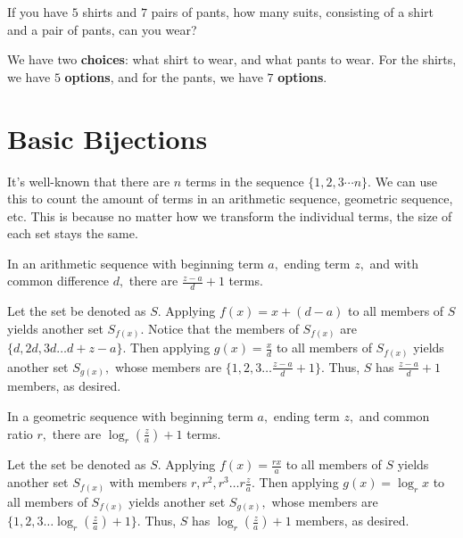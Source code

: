 \documentclass[blue,onecol]{shooting}
\begin{document}
\begin{exam}
If you have $5$ shirts and $7$ pairs of pants, how many suits, consisting of a shirt and a pair of pants, can you wear?
\end{exam}

\begin{sol}
We have two \textbf{choices}: what shirt to wear, and what pants to wear. For the shirts, we have $5$ \textbf{options}, and for the pants, we have $7$ \textbf{options}.
\end{sol}

\section{Basic Bijections}

It's well-known that there are $n$ terms in the sequence $\{1,2,3\cdots n\}.$ We can use this to count the amount of terms in an arithmetic sequence, geometric sequence, etc. This is because no matter how we transform the individual terms, the size of each set stays the same.

\begin{theo}
In an arithmetic sequence with beginning term $a,$ ending term $z,$ and with common difference $d,$ there are $\frac{z-a}{d}+1$ terms.
\end{theo}

\begin{pro}
Let the set be denoted as $S.$ Applying $f(x)=x+(d-a)$ to all members of $S$ yields another set $S_{f(x)}.$ Notice that the members of $S_{f(x)}$ are $\{d,2d,3d\dots d+z-a\}.$ Then applying $g(x)=\frac{x}{d}$ to all members of $S_{f(x)}$ yields another set $S_{g(x)},$ whose members are $\{1,2,3\dots \frac{z-a}{d}+1\}.$ Thus, $S$ has $\frac{z-a}{d}+1$ members, as desired.
\end{pro}

\begin{theo}
In a geometric sequence with beginning term $a,$ ending term $z,$ and common ratio $r,$ there are $\log_r(\frac{z}{a})+1$ terms.
\end{theo}

\begin{pro}
Let the set be denoted as $S.$ Applying $f(x)=\frac{rx}{a}$ to all members of $S$ yields another set $S_{f(x)}$ with members $r,r^2,r^3\dots r\frac{z}{a}.$ Then applying $g(x)=\log_r{x}$ to all members of $S_{f(x)}$ yields another set $S_{g(x)},$ whose members are $\{1,2,3\dots\log_r(\frac{z}{a})+1\}.$ Thus, $S$ has $\log_r(\frac{z}{a})+1$ members, as desired.
\end{pro}
\end{document}
